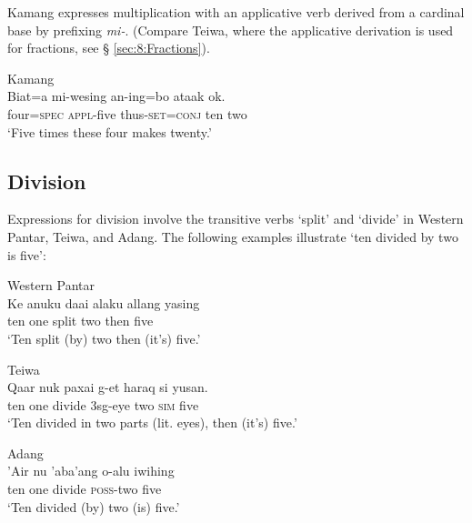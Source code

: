  

Kamang expresses multiplication with an applicative verb derived from a cardinal base by prefixing \textit{mi-}. (Compare Teiwa, where the applicative derivation is used for fractions, see {\S} \ref{sec:8:Fractions}). 




\ea%
\label{bkm:Ref358043179}
{\upshape Kamang}\\
\gll   Biat=a  mi-wesing  an-ing=bo  ataak   ok.  \\  
    four=\textsc{spec}  \textsc{appl-}five  thus\textsc{-set}=\textsc{conj} ten  two   \\
\glt  `Five times these four makes twenty.'
\z


\subsection{Division}
\label{sec:8:Division}
Expressions for division involve the transitive verbs `split' and `divide' in Western Pantar, Teiwa, and Adang. The following examples illustrate `ten divided by two is five': 


\ea%
\label{bkm:Ref342664493}
{\upshape Western  Pantar}\\
 
\gll   Ke anuku  daai  alaku  allang  yasing\\  
    ten one  split  two  then  five \\
\glt `Ten split (by) two then (it's) five.'
\z



 

 


\ea
\label{ex:8:1246}
{\upshape Teiwa}\\  
 \gll Qaar  nuk  paxai  g-et  haraq  si  yusan.   \\
  ten  one  divide  3sg-eye  two  \textsc{sim}  five   \\
 \glt `Ten divided in two parts (lit. eyes), then (it's) five.'
\z
 

\ea%
\label{bkm:Ref342664505}
{\upshape Adang}\\
\gll  'Air nu  'aba'ang  o-alu  iwihing\\  
    ten one  divide  \textsc{poss-}two  five \\
\glt `Ten divided (by) two (is) five.'  
\z

 

